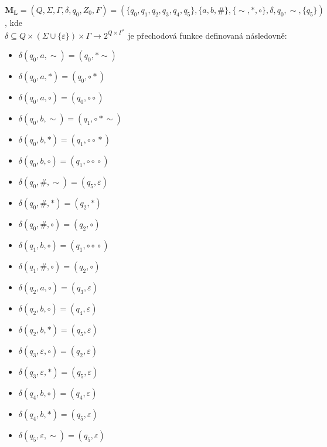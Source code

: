 \documentclass[a4paper, 11pt]{scrartcl}
\begin{document}
    $ \mathbf{M_L} = (Q, \Sigma, \Gamma, \delta, q_0, Z_0, F) = (\{q_0, q_1,
    q_2, q_3, q_4, q_5\}, \{a, b, \#\}, \{\sim, *, \circ\}, \delta, q_0, \sim,
    \{q_5\}) $, kde \\ $ \delta \subseteq Q \times (\Sigma \cup \{\varepsilon\})
    \times \Gamma \rightarrow 2^{Q \times \Gamma^*} $ je přechodová funkce
    definovaná následovně: \\[10pt]
    \begin{minipage}{.45\linewidth}
        \begin{itemize}[label=]
            \item $ \delta(q_0, a, \sim) = (q_0, *\!\sim) $
            \item $ \delta(q_0, a, *) = (q_0, \circ*) $
            \item $ \delta(q_0, a, \circ) = (q_0, \circ\circ) $
            \item $ \delta(q_0, b, \sim) = (q_1, \circ*\!\sim) $
            \item $ \delta(q_0, b, *) = (q_1, \circ\!\circ\!*) $
            \item $ \delta(q_0, b, \circ) = (q_1, \circ\!\circ\!\circ) $
            \item $ \delta(q_0, \#, \sim) = (q_5, \varepsilon) $
            \item $ \delta(q_0, \#, *) = (q_2, *) $
            \item $ \delta(q_0, \#, \circ) = (q_2, \circ) $
            \item $ \delta(q_1, b, \circ) = (q_1, \circ\!\circ\!\circ) $
        \end{itemize}
    \end{minipage}
    \hfill
    \begin{minipage}{.45\linewidth}
        \begin{itemize}[label=]
            \item $ \delta(q_1, \#, \circ) = (q_2, \circ) $
            \item $ \delta(q_2, a, \circ) = (q_3, \varepsilon) $
            \item $ \delta(q_2, b, \circ) = (q_4, \varepsilon) $
            \item $ \delta(q_2, b, *) = (q_5, \varepsilon) $
            \item $ \delta(q_3, \varepsilon, \circ) = (q_2, \varepsilon) $
            \item $ \delta(q_3, \varepsilon, *) = (q_5, \varepsilon) $
            \item $ \delta(q_4, b, \circ) = (q_4, \varepsilon) $
            \item $ \delta(q_4, b, *) = (q_5, \varepsilon) $
            \item $ \delta(q_5, \varepsilon, \sim) = (q_5, \varepsilon) $
        \end{itemize}
    \end{minipage} \\[10pt]
\end{document}
